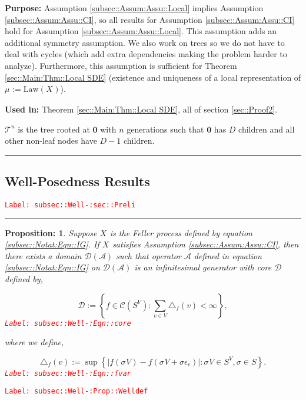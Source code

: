 \documentclass[12pt]{article}
\newcommand{\mc}{\mathcal}
\newcommand{\te}{\text}
\newcommand{\ep}{\epsilon}
\newcommand{\tr}{\textcolor{red}}
\newcommand{\labe}[1]{\tr{\texttt{Label: #1}}}
\newcommand{\purpose}{\textbf{Purpose: }}
\newcommand{\usein}{\textbf{Used in: }}
\newcommand{\ind}{\hspace{24pt}}
\newcommand{\lin}{\rule{\linewidth}{0.4 pt}}
\newcommand{\defeq}{:=}								%
\renewcommand{\root}{\mathbf{0}}				%
\renewcommand{\v}{v}							%
\renewcommand{\S}{S}							%
\newcommand{\s}{\sigma}							%
\newcommand{\sv}[1]{\s^{#1}}					%
\newcommand{\ev}[1]{\ep_{#1}}					%
\newcommand{\degr}{D}								%
\newcommand{\IG}{\mc{A}}						%
\newcommand{\law}{\te{Law}}							%
\newcommand{\tree}{\mc{T}}							%
\newcommand{\core}{\mc{D}}							%
\newcommand{\V}{V}									%
\newcommand{\numb}{n}								%
\newcommand{\XState}[1]{\S^{#1}}				%
\newcommand{\rxvts}[2]{X_{#1}{#2}}					%
\newcommand{\m}[3]{\mu_{#2#1}^{#3}}						%
\newcommand{\cont}{\mc{C}}							%
\newtheorem{prop}[thms]{Proposition: }
\begin{document}
\purpose Assumption \ref{subsec::Assum:Assu::Local} implies Assumption \ref{subsec::Assum:Assu::CI}, so all results for Assumption \ref{subsec::Assum:Assu::CI} hold for Assumption \ref{subsec::Assum:Assu::Local}. This assumption adds an additional symmetry assumption. We also work on trees so we do not have to deal with cycles (which add extra dependencies making the problem harder to analyze). Furthermore, this assumption is sufficient for Theorem \ref{sec::Main:Thm::Local SDE} (existence and uniqueness of a local representation of \(\m{}{}{} \defeq \law(\rxvts{}{})\)).

\usein Theorem \ref{sec::Main:Thm::Local SDE}, all of section \ref{sec::Proof2}.

\ind \(\tree^\numb\) is the tree rooted at \(\root\) with \(\numb\) generations such that \(\root\) has \(\degr\) children and all other non-leaf nodes have \(\degr-1\) children.

\lin

\subsection{Well-Posedness Results}
\label{subsec::Well-:sec::Preli}\labe{subsec::Well-:sec::Preli}

\rule{\linewidth}{0.4 pt}

\begin{prop}
Suppose \(\rxvts{}{}\) is the Feller process defined by equation \eqref{subsec::Notat:Eqn::IG}. If \(\rxvts{}{}\) satisfies Assumption \ref{subsec::Assum:Assu::CI}, then there exists a domain \(\core(\IG)\) such that operator \(\IG\) defined in equation \eqref{subsec::Notat:Eqn::IG} on \(\mc{D}(\IG)\) is an infinitesimal generator with core \(\core\) defined by,

\begin{equation}
\core \defeq \left\{f \in \cont(\S^\V): \sum_{\v\in\V} \triangle_f(\v) < \infty\right\},
\label{subsec::Well-:Eqn::core}
\end{equation}
\labe{subsec::Well-:Eqn::core}

where we define,

\begin{equation}
\triangle_f(\v) \defeq \sup\left\{|f(\sv{}{\V}) - f(\sv{}{\V}+\s\ev{\v})|: \sv{}{\V} \in \S^\V,\s \in \S\right\}.
\label{subsec::Well-:Eqn::fvar}
\end{equation}
\labe{subsec::Well-:Eqn::fvar}

\label{subsec::Well-:Prop::Welldef}
\end{prop}
\labe{subsec::Well-:Prop::Welldef}
\end{document}
